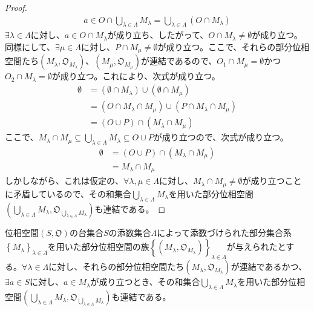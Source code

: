 \documentclass[dvipdfmx]{jsarticle}
\begin{document}
\begin{proof}
\begin{align*}
a \in O \cap \bigcup_{\lambda \in \varLambda} M_{\lambda} = \bigcup_{\lambda \in \varLambda} \left( O \cap M_{\lambda} \right)
\end{align*}
$\exists\lambda \in \varLambda$に対し、$a \in O \cap M_{\lambda}$が成り立ち、したがって、$O \cap M_{\lambda} \neq \emptyset$が成り立つ。同様にして、$\exists\mu \in \varLambda$に対し、$P \cap M_{\mu} \neq \emptyset$が成り立つ。ここで、それらの部分位相空間たち$\left( M_{\lambda},\mathfrak{O}_{M_{\lambda}} \right)$、$\left( M_{\mu},\mathfrak{O}_{M_{\mu}} \right)$が連結であるので、$O_{1} \cap M_{\mu} = \emptyset$かつ$O_{2} \cap M_{\lambda} = \emptyset$が成り立つ。これにより、次式が成り立つ。
\begin{align*}
\emptyset &= \left( \emptyset \cap M_{\lambda} \right) \cup \left( \emptyset \cap M_{\mu} \right)\\
&= \left( O \cap M_{\lambda} \cap M_{\mu} \right) \cup \left( P \cap M_{\lambda} \cap M_{\mu} \right)\\
&= (O \cup P) \cap \left( M_{\lambda} \cap M_{\mu} \right)
\end{align*}
ここで、$M_{\lambda} \cap M_{\mu} \subseteq \bigcup_{\lambda \in \varLambda} M_{\lambda} \subseteq O \cup P$が成り立つので、次式が成り立つ。
\begin{align*}
\emptyset &= (O \cup P) \cap \left( M_{\lambda} \cap M_{\mu} \right)\\
&= M_{\lambda} \cap M_{\mu}
\end{align*}
しかしながら、これは仮定の、$\forall\lambda,\mu \in \varLambda$に対し、$M_{\lambda} \cap M_{\mu} \neq \emptyset$が成り立つことに矛盾しているので、その和集合$\bigcup_{\lambda \in \varLambda} M_{\lambda}$を用いた部分位相空間$\left( \bigcup_{\lambda \in \varLambda} M_{\lambda},\mathfrak{O}_{\bigcup_{\lambda \in \varLambda} M_{\lambda}} \right)$も連結である。
\end{proof}
\begin{thm}\label{8.1.5.7}
位相空間$\left( S,\mathfrak{O} \right)$の台集合$S$の添数集合$\varLambda$によって添数づけられた部分集合系$\left\{ M_{\lambda} \right\}_{\lambda \in \varLambda}$を用いた部分位相空間の族$\left\{ \left( M_{\lambda},\mathfrak{O}_{M_{\lambda}} \right) \right\}_{\lambda \in \varLambda}$が与えられたとする。$\forall\lambda \in \varLambda$に対し、それらの部分位相空間たち$\left( M_{\lambda},\mathfrak{O}_{M_{\lambda}} \right)$が連結であるかつ、$\exists a \in S$に対し、$a \in M_{\lambda}$が成り立つとき、その和集合$\bigcup_{\lambda \in \varLambda} M_{\lambda}$を用いた部分位相空間$\left( \bigcup_{\lambda \in \varLambda} M_{\lambda},\mathfrak{O}_{\bigcup_{\lambda \in \varLambda} M_{\lambda}} \right)$も連結である。
\end{thm}
\end{document}
